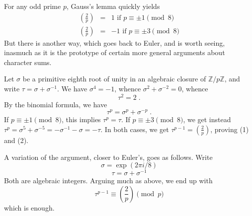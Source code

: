 \documentclass[12pt]{article}
\begin{document}
For any odd prime $p$, Gauss's lemma quickly yields
\begin{eqnarray}
\left( \frac{2}{p} \right) &=& 1 \text{ if }p\equiv\pm 1\pmod{8} \\
\left( \frac{2}{p} \right) &=& -1 \text{ if }p\equiv\pm 3\pmod{8}
\end{eqnarray}
But there is another way, which goes back to Euler, and is worth
seeing, inasmuch as it is the prototype of certain more general arguments
about character sums.

Let $\sigma$ be a primitive eighth root of unity in an algebraic closure
of $\mathbb{Z}/p\mathbb{Z}$, and write $\tau=\sigma+\sigma^{-1}$. 
We have $\sigma^4=-1$,
whence $\sigma^2+\sigma^{-2}=0$, whence
$$\tau^2=2\;.$$
By the binomial formula, we have
$$\tau^p=\sigma^p+\sigma^{-p}\;.$$
If $p\equiv\pm 1\pmod 8$, this implies $\tau^p=\tau$.
If $p\equiv\pm 3\pmod 8$, we get instead $\tau^p=\sigma^5+\sigma^{-5}=
-\sigma^{-1}-\sigma=-\tau$.
In both cases, we get $\tau^{p-1}=\left( \frac{2}{p} \right)$,
proving (1) and (2).

A variation of the argument, closer to Euler's, goes as follows.
Write
$$\sigma=\exp(2\pi i/8)$$
$$\tau=\sigma+\sigma^{-1}$$
Both are algebraic integers. Arguing much as above, we end up with
$$\tau^{p-1}\equiv\left( \frac{2}{p} \right)\pmod{p}$$
which is enough.
\end{document}
